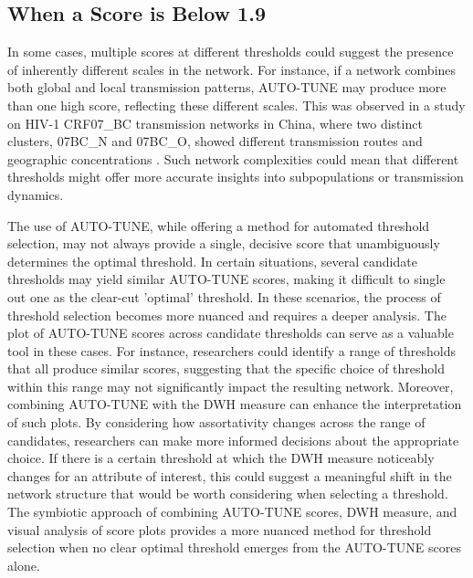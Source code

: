\documentclass[utf8]{FrontiersinHarvard} %
\begin{document}
\subsection{When a Score is Below 1.9}

In some cases, multiple scores at different thresholds could suggest the
presence of inherently different scales in the network. For instance, if a
network combines both global and local transmission patterns, AUTO-TUNE may
produce more than one high score, reflecting these different scales. This was
observed in a study on HIV-1 CRF07\_BC transmission networks in China, where
two distinct clusters, 07BC\_N and 07BC\_O, showed different transmission
routes and geographic concentrations \citep{ding_characterizing_2022}. Such
network complexities could mean that different thresholds might offer more
accurate insights into subpopulations or transmission dynamics.

The use of AUTO-TUNE, while offering a method for automated threshold
selection, may not always provide a single, decisive score that unambiguously
determines the optimal threshold. In certain situations, several candidate
thresholds may yield similar AUTO-TUNE scores, making it difficult to single
out one as the clear-cut 'optimal' threshold. In these scenarios, the process
of threshold selection becomes more nuanced and requires a deeper analysis. The
plot of AUTO-TUNE scores across candidate thresholds can serve as a valuable
tool in these cases. For instance, researchers could identify a range of
thresholds that all produce similar scores, suggesting that the specific choice
of threshold within this range may not significantly impact the resulting
network. Moreover, combining AUTO-TUNE with the DWH measure can enhance the
interpretation of such plots. By considering how assortativity changes across
the range of candidates, researchers can make more informed decisions about the
appropriate choice. If there is a certain threshold at which the DWH measure
noticeably changes for an attribute of interest, this could suggest a
meaningful shift in the network structure that would be worth considering when
selecting a threshold. The symbiotic approach of combining AUTO-TUNE scores,
DWH measure, and visual analysis of score plots provides a more nuanced method
for threshold selection when no clear optimal threshold emerges from the
AUTO-TUNE scores alone.
\end{document}
